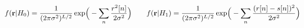\documentclass[preview]{standalone}
\begin{document}
\begin{align*}
\special{dvisvgm:raw <g id='unique000'>}f(\mathbf r|H_0)=\frac{1}{(2\pi\sigma^2)^{L/2}}\exp\!\Big(-\sum_n \frac{r^2[n]}{2\sigma^2}\Big)\qquad{}f(\mathbf r|H_1)=\frac{1}{(2\pi\sigma^2)^{L/2}}\exp\!\Big(-\sum_n \frac{(r[n]-s[n])^2}{2\sigma^2}\Big)\special{dvisvgm:raw </g>}
\end{align*}
\end{document}
